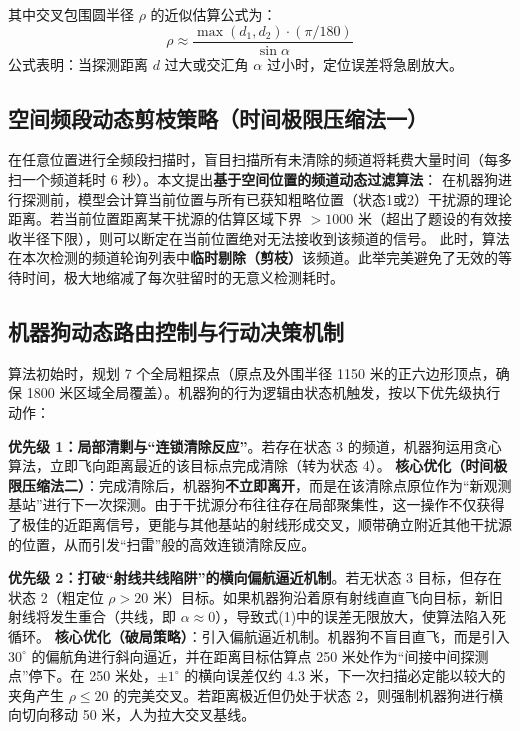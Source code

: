 \documentclass[12pt,a4paper]{article}
\begin{document}
其中交叉包围圆半径 $\rho$ 的近似估算公式为：
\begin{equation}
    \rho \approx \frac{\max(d_1, d_2) \cdot (\pi/180)}{\sin \alpha}
\end{equation}
公式表明：当探测距离 $d$ 过大或交汇角 $\alpha$ 过小时，定位误差将急剧放大。

\subsection{空间频段动态剪枝策略（时间极限压缩法一）}
在任意位置进行全频段扫描时，盲目扫描所有未清除的频道将耗费大量时间（每多扫一个频道耗时 6 秒）。本文提出\textbf{基于空间位置的频道动态过滤算法}：
在机器狗进行探测前，模型会计算当前位置与所有已获知粗略位置（状态1或2）干扰源的理论距离。若当前位置距离某干扰源的估算区域下界 $>1000$ 米（超出了题设的有效接收半径下限），则可以断定在当前位置绝对无法接收到该频道的信号。
此时，算法在本次检测的频道轮询列表中\textbf{临时剔除（剪枝）}该频道。此举完美避免了无效的等待时间，极大地缩减了每次驻留时的无意义检测耗时。

\subsection{机器狗动态路由控制与行动决策机制}
算法初始时，规划 7 个全局粗探点（原点及外围半径 1150 米的正六边形顶点，确保 1800 米区域全局覆盖）。机器狗的行为逻辑由状态机触发，按以下优先级执行动作：

\noindent\textbf{优先级 1：局部清剿与“连锁清除反应”}。若存在状态 3 的频道，机器狗运用贪心算法，立即飞向距离最近的该目标点完成清除（转为状态 4）。
\textbf{核心优化（时间极限压缩法二）}：完成清除后，机器狗\textbf{不立即离开}，而是在该清除点原位作为“新观测基站”进行下一次探测。由于干扰源分布往往存在局部聚集性，这一操作不仅获得了极佳的近距离信号，更能与其他基站的射线形成交叉，顺带确立附近其他干扰源的位置，从而引发“扫雷”般的高效连锁清除反应。

\noindent\textbf{优先级 2：打破“射线共线陷阱”的横向偏航逼近机制}。若无状态 3 目标，但存在状态 2（粗定位 $\rho > 20$ 米）目标。如果机器狗沿着原有射线直直飞向目标，新旧射线将发生重合（共线，即 $\alpha \approx 0$），导致式(1)中的误差无限放大，使算法陷入死循环。
\textbf{核心优化（破局策略）}：引入偏航逼近机制。机器狗不盲目直飞，而是引入 $30^\circ$ 的偏航角进行斜向逼近，并在距离目标估算点 250 米处作为“间接中间探测点”停下。在 250 米处，$\pm 1^\circ$ 的横向误差仅约 4.3 米，下一次扫描必定能以较大的夹角产生 $\rho \le 20$ 的完美交叉。若距离极近但仍处于状态 2，则强制机器狗进行横向切向移动 50 米，人为拉大交叉基线。
\end{document}
